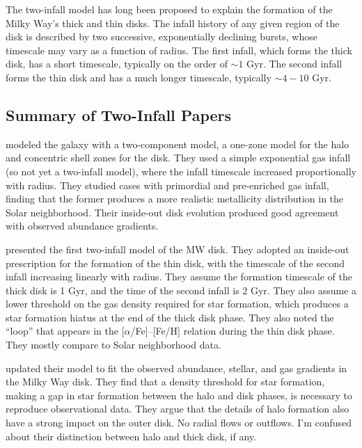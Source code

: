 \documentclass[twocolumn,twocolappendix,linenumbers]{aastex631}
\newcommand{\aFe}{[$\alpha$/Fe]\xspace}
\begin{document}

The two-infall model has long been proposed to explain the formation of the Milky Way's thick and thin disks. The infall history of any given region of the disk is described by two successive, exponentially declining bursts, whose timescale may vary as a function of radius. The first infall, which forms the thick disk, has a short timescale, typically on the order of $\sim1$ Gyr. The second infall forms the thin disk and has a much longer timescale, typically $\sim4-10$ Gyr.

\subsection{Summary of Two-Infall Papers}

\citet{matteucci_galactic_1989} modeled the galaxy with a two-component model, a one-zone model for the halo and concentric shell zones for the disk. They used a simple exponential gas infall (so not yet a two-infall model), where the infall timescale increased proportionally with radius. They studied cases with primordial and pre-enriched gas infall, finding that the former produces a more realistic metallicity distribution in the Solar neighborhood. Their inside-out disk evolution produced good agreement with observed abundance gradients.

\citet{chiappini_chemical_1997} presented the first two-infall model of the MW disk. They adopted an inside-out prescription for the formation of the thin disk, with the timescale of the second infall increasing linearly with radius. They assume the formation timescale of the thick disk is 1 Gyr, and the time of the second infall is 2 Gyr. They also assume a lower threshold on the gas density required for star formation, which produces a star formation hiatus at the end of the thick disk phase. They also noted the ``loop'' that appears in the \aFe--[Fe/H] relation during the thin disk phase. They mostly compare to Solar neighborhood data.

\citet{chiappini_abundance_2001} updated their model to fit the observed abundance, stellar, and gas gradients in the Milky Way disk. They find that a density threshold for star formation, making a gap in star formation between the halo and disk phases, is necessary to reproduce observational data. They argue that the details of halo formation also have a strong impact on the outer disk. No radial flows or outflows. I'm confused about their distinction between halo and thick disk, if any.
\end{document}
